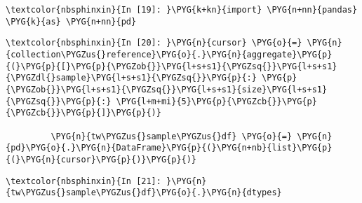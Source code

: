 \documentclass[letterpaper,10pt,english]{sphinxmanual}
\begin{document}
%
\begin{Verbatim}[commandchars=\\\{\}]
\textcolor{nbsphinxin}{In [19]: }\PYG{k+kn}{import} \PYG{n+nn}{pandas} \PYG{k}{as} \PYG{n+nn}{pd}
\end{Verbatim}

%
\begin{Verbatim}[commandchars=\\\{\}]
\textcolor{nbsphinxin}{In [20]: }\PYG{n}{cursor} \PYG{o}{=} \PYG{n}{collection\PYGZus{}reference}\PYG{o}{.}\PYG{n}{aggregate}\PYG{p}{(}\PYG{p}{[}\PYG{p}{\PYGZob{}}\PYG{l+s+s1}{\PYGZsq{}}\PYG{l+s+s1}{\PYGZdl{}sample}\PYG{l+s+s1}{\PYGZsq{}}\PYG{p}{:} \PYG{p}{\PYGZob{}}\PYG{l+s+s1}{\PYGZsq{}}\PYG{l+s+s1}{size}\PYG{l+s+s1}{\PYGZsq{}}\PYG{p}{:} \PYG{l+m+mi}{5}\PYG{p}{\PYGZcb{}}\PYG{p}{\PYGZcb{}}\PYG{p}{]}\PYG{p}{)}
         
         \PYG{n}{tw\PYGZus{}sample\PYGZus{}df} \PYG{o}{=} \PYG{n}{pd}\PYG{o}{.}\PYG{n}{DataFrame}\PYG{p}{(}\PYG{n+nb}{list}\PYG{p}{(}\PYG{n}{cursor}\PYG{p}{)}\PYG{p}{)}
\end{Verbatim}

%
\begin{Verbatim}[commandchars=\\\{\}]
\textcolor{nbsphinxin}{In [21]: }\PYG{n}{tw\PYGZus{}sample\PYGZus{}df}\PYG{o}{.}\PYG{n}{dtypes}
\end{Verbatim}
\end{document}
